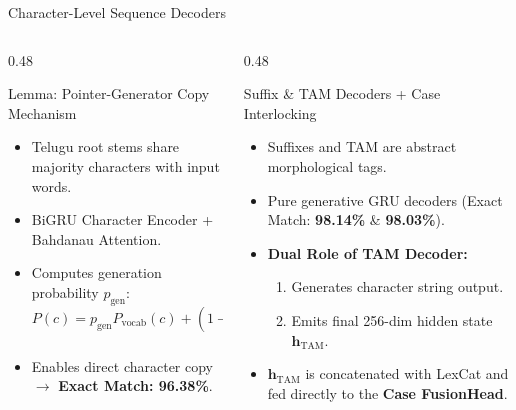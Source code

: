 \documentclass[aspectratio=169, 10pt]{beamer}
\begin{document}
\begin{frame}{Character-Level Sequence Decoders}
  \begin{columns}[T]
    \begin{column}{0.48\textwidth}
      \begin{block}{Lemma: Pointer-Generator Copy Mechanism}
        \begin{itemize}
          \item Telugu root stems share majority characters with input words.
          \item BiGRU Character Encoder + Bahdanau Attention.
          \item Computes generation probability $p_{\text{gen}}$:
          \[
            P(c) = p_{\text{gen}} P_{\text{vocab}}(c) + (1 - p_{\text{gen}}) \sum_{i: c_i = c} \alpha_i
          \]
          \item Enables direct character copy $\rightarrow$ \textbf{Exact Match: 96.38\%}.
        \end{itemize}
      \end{block}
    \end{column}

    \begin{column}{0.48\textwidth}
      \begin{block}{Suffix \& TAM Decoders + Case Interlocking}
        \begin{itemize}
          \item Suffixes and TAM are abstract morphological tags.
          \item Pure generative GRU decoders (Exact Match: \textbf{98.14\%} \& \textbf{98.03\%}).
          \item \textbf{Dual Role of TAM Decoder:}
          \begin{enumerate}
            \item Generates character string output.
            \item Emits final 256-dim hidden state $\mathbf{h}_{\text{TAM}}$.
          \end{enumerate}
          \item $\mathbf{h}_{\text{TAM}}$ is concatenated with LexCat and fed directly to the \textbf{Case FusionHead}.
        \end{itemize}
      \end{block}
    \end{column}
  \end{columns}
\end{frame}
\end{document}
